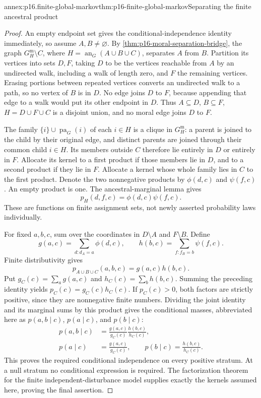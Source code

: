 \begin{annexitem}{annex:p16.finite-global-markov}{thm:p16-finite-global-markov}{Separating the finite ancestral product}
\begin{proof}
An empty endpoint set gives the conditional-independence identity
immediately, so assume \(A,B\ne\varnothing\). By
\cref{thm:p16-moral-separation-bridge}, the graph
\(G_H^{\mathrm m}\setminus C\), where
\(H=\operatorname{an}_G(A\cup B\cup C)\), separates \(A\)
from \(B\). Partition its vertices into sets \(D,F\), taking
\(D\) to be the vertices reachable from \(A\) by an undirected
walk, including a walk of length zero, and \(F\) the remaining
vertices. Erasing portions between repeated vertices converts an
undirected walk to a path, so no vertex of \(B\) is in \(D\).
No edge joins \(D\) to \(F\), because appending that edge to a
walk would put its other endpoint in \(D\). Thus \(A\subseteq D\),
\(B\subseteq F\), \(H=D\cup F\cup C\) is a disjoint union,
and no moral edge joins \(D\) to \(F\).

The family \(\{i\}\cup\operatorname{pa}_G(i)\) of each
\(i\in H\) is a clique in \(G_H^{\mathrm m}\): a parent is
joined to the child by their original edge, and distinct parents are
joined through their common child \(i\in H\). Its members outside
\(C\) therefore lie entirely in \(D\) or entirely in \(F\).
Allocate its kernel to a first product if those members lie in \(D\),
and to a second product if they lie in \(F\). Allocate a kernel
whose whole family lies in \(C\) to the first product. Denote the
two nonnegative products by \(\phi(d,c)\) and \(\psi(f,c)\).
An empty product is one. The ancestral-marginal lemma gives
\[
 p_H(d,f,c)=\phi(d,c)\psi(f,c).
\]
These are functions on finite assignment sets, not newly asserted
probability laws individually.

For fixed \(a,b,c\), sum over the coordinates in \(D\setminus A\)
and \(F\setminus B\). Define
\[
 g(a,c)=\sum_{d:d_A=a}\phi(d,c),\qquad
 h(b,c)=\sum_{f:f_B=b}\psi(f,c).
\]
Finite distributivity gives
\[
 p_{A\cup B\cup C}(a,b,c)=g(a,c)h(b,c).
\]
Put \(g_C(c)=\sum_a g(a,c)\) and
\(h_C(c)=\sum_b h(b,c)\). Summing the preceding identity yields
\(p_C(c)=g_C(c)h_C(c)\). If \(p_C(c)>0\), both factors are
strictly positive, since they are nonnegative finite numbers. Dividing
the joint identity and its marginal sums by this product gives the
conditional masses, abbreviated here as \(p(a,b\mid c)\),
\(p(a\mid c)\), and \(p(b\mid c)\):
\[
\begin{aligned}
 p(a,b\mid c)&=\frac{g(a,c)}{g_C(c)}
                         \frac{h(b,c)}{h_C(c)},\\
 p(a\mid c)&=\frac{g(a,c)}{g_C(c)},\qquad
 p(b\mid c)=\frac{h(b,c)}{h_C(c)}.
\end{aligned}
\]
This proves the required conditional independence on every positive
stratum. At a null stratum no conditional expression is required.
The factorization theorem for the finite independent-disturbance model
supplies exactly the kernels assumed here, proving the final assertion.
\end{proof}
\end{annexitem}


